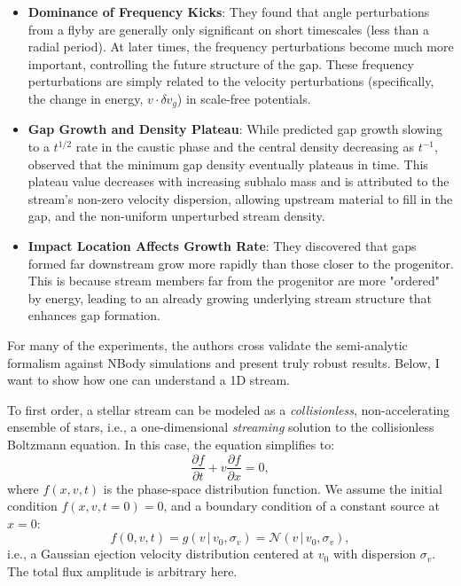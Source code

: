             \begin{itemize}
                \item \textbf{Dominance of Frequency Kicks}: They found that angle perturbations from a flyby are generally only significant on short timescales (less than a radial period). At later times, the frequency perturbations become much more important, controlling the future structure of the gap. These frequency perturbations are simply related to the velocity perturbations (specifically, the change in energy, $v \cdot \delta v_g$) in scale-free potentials.
                \item \textbf{Gap Growth and Density Plateau}: While \citet{2015MNRAS.450.1136E} predicted gap growth slowing to a $t^{1/2}$ rate in the caustic phase and the central density decreasing as $t^{-1}$, \citet{2016MNRAS.457.3817S} observed that the minimum gap density eventually plateaus in time. This plateau value decreases with increasing subhalo mass and is attributed to the stream's non-zero velocity dispersion, allowing upstream material to fill in the gap, and the non-uniform unperturbed stream density.
                \item \textbf{Impact Location Affects Growth Rate}: They discovered that gaps formed far downstream grow more rapidly than those closer to the progenitor. This is because stream members far from the progenitor are more "ordered" by energy, leading to an already growing underlying stream structure that enhances gap formation.
            \end{itemize}
            For many of the experiments, the authors cross validate the semi-analytic formalism against NBody simulations and present truly robust results. Below, I want to show how one can understand a 1D stream. 

            To first order, a stellar stream can be modeled as a \textit{collisionless}, non-accelerating ensemble of stars, i.e., a one-dimensional \textit{streaming} solution to the collisionless Boltzmann equation. In this case, the equation simplifies to:
            \begin{equation}
                \frac{\partial f}{\partial t} + v \frac{\partial f}{\partial x} = 0,
            \end{equation}
            where \( f(x,v,t) \) is the phase-space distribution function. We assume the initial condition \( f(x,v,t=0) = 0 \), and a boundary condition of a constant source at \( x=0 \):
            \begin{equation}
                f(0,v,t) = g(v \,|\, v_0, \sigma_v) = \mathcal{N}(v \,|\, v_0, \sigma_v),
            \end{equation}
            i.e., a Gaussian ejection velocity distribution centered at \( v_0 \) with dispersion \( \sigma_v \). The total flux amplitude is arbitrary here.


